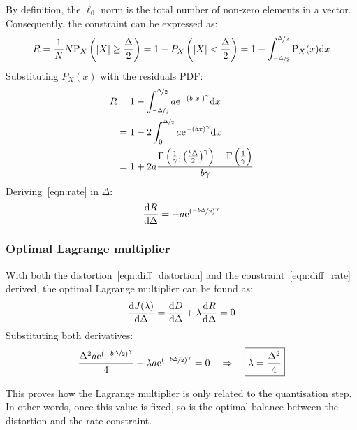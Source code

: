 \documentclass[11pt,a4paper,openright,twoside]{book}
\numberwithin{equation}{section} %
\numberwithin{figure}{section} %
\numberwithin{table}{section} %
\begin{document}
By definition, the $\ell_0$ norm is the total number of non-zero
elements in a vector.
Consequently, the constraint can be expressed as:
\begin{equation}
	R 
	= \frac{1}{N} N \text{P}_X\left(\vert X \vert \ge \frac{\Delta}{2}\right)
	= 1-P_X\left(\vert X \vert < \frac{\Delta}{2}\right)
	= 1-\int_{\nicefrac{-\Delta}{2}}^{\nicefrac{\Delta}{2}}\text{P}_X(x)\text{d} x
	\label{eqn:int_rate}
\end{equation}
Substituting $P_X(x)$ with the residuals \ac{PDF}:
\begin{align}
	R
	&=1-\int_{\nicefrac{-\Delta}{2}}^{\nicefrac{\Delta}{2}}
	a \text{e}^{-{\left(b\vert x \vert\right)}^\gamma} \text{d} x \\
	&=1-2\int_0^{\nicefrac{\Delta}{2}}
	a \text{e}^{-{\left(b x \right)}^\gamma} \text{d} x \\
	&=1+2a\frac{\Gamma\left(
		\frac{1}{\gamma},{\left(\frac{b\Delta}{2}\right)}^\gamma\right)-
		\Gamma\left(\frac{1}{\gamma}\right)}
		{b\gamma}
	\label{eqn:rate}
\end{align}
Deriving~\eqref{eqn:rate} in $\Delta$:
\begin{equation}
	\frac{\text{d} R}{\text{d}\Delta} =
	-a\text{e}^{{\left(\nicefrac{-b\Delta}{2}\right)}^\gamma}
	\label{eqn:diff_rate}
\end{equation}
\subsubsection{Optimal Lagrange multiplier}
\label{ssub:optimal_lagrange_multiplier}

With both the distortion~\eqref{eqn:diff_distortion} and the
constraint~\eqref{eqn:diff_rate} derived, the optimal Lagrange
multiplier can be found as:
\begin{equation}
	\frac{\text{d} J(\lambda)}{\text{d} \Delta}
	= \frac{\text{d} D}{\text{d} \Delta} +
	\lambda \frac{\text{d} R}{\text{d} \Delta} = 0 \\
	\label{eqn:diff_lagrange_multiplier}
\end{equation}
Substituting both derivatives:
\begin{equation}
	\frac{\Delta^2 a \text{e}^{{(-b\nicefrac{\Delta}{2})}^\gamma}}{4}
	- \lambda
	a\text{e}^{{\left(\nicefrac{-b\Delta}{2}\right)}^\gamma} = 0
	\quad \Rightarrow \quad \boxed{\lambda = \frac{\Delta^2}{4}}
\end{equation}

This proves how the Lagrange multiplier is only related to the quantisation
step.
In other words, once this value is fixed, so is the optimal balance between
the distortion and the rate constraint.
\end{document}
